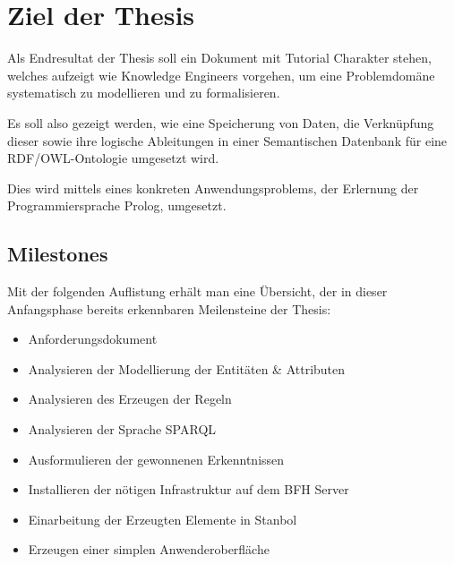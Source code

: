 \chapter{Ziel der Thesis}
\label{chap:thesisziel}
Als Endresultat der Thesis soll ein Dokument mit Tutorial Charakter stehen, welches aufzeigt wie Knowledge Engineers vorgehen, um eine Problemdomäne systematisch zu modellieren und zu formalisieren. 

Es soll also gezeigt werden, wie eine Speicherung von Daten, die Verknüpfung dieser sowie ihre logische Ableitungen in einer Semantischen Datenbank für eine RDF/OWL-Ontologie  umgesetzt wird.~\cite{Aufgabenstellung}

 
Dies wird mittels eines konkreten Anwendungsproblems, der Erlernung der Programmiersprache Prolog, umgesetzt.

\section{Milestones}
\label{sec:Milestones}
Mit der folgenden Auflistung erhält man eine Übersicht, der in dieser Anfangsphase bereits erkennbaren Meilensteine der Thesis:
\begin{itemize}
	\item Anforderungsdokument \\
	\item Analysieren der Modellierung der Entitäten & Attributen \\
	\item Analysieren des Erzeugen der Regeln \\
	\item Analysieren der Sprache SPARQL	\\
	\item Ausformulieren der gewonnenen Erkenntnissen \\
	\item Installieren der nötigen Infrastruktur auf dem BFH Server\\
	\item Einarbeitung der Erzeugten Elemente in Stanbol \\
	\item Erzeugen einer simplen Anwenderoberfläche \\
\end{itemize}

